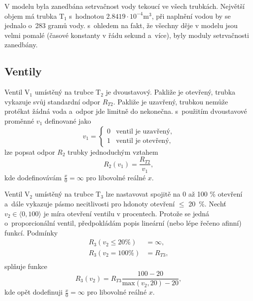 \documentclass[conference]{IEEEtran}
\begin{document}
V modelu byla zanedbána setrvačnost vody tekoucí ve všech trubkách. Největší objem má trubka $\text{T}_1$ s~hodnotou $2.8419 \cdot 10^{-4} \si{\metre\cubed}$,
při naplnění vodou by se jednalo o~283 gramů vody. s~ohledem na fakt, že všechny děje v modelu jsou velmi pomalé (časové konstanty v řádu sekund a~více),
byly moduly setrvačnosti zanedbány.


\subsection{Ventily}
\label{sec:ventily}

Ventil $\text{V}_1$ umístěný na trubce $\text{T}_2$ je dvoustavový. Pakliže je otevřený, trubka vykazuje svůj standardní odpor $R_{T2}$.
Pakliže je uzavřený, trubkou nemůže protékat žádná voda a~odpor jde limitně do nekonečna. s~použitím dvoustavové proměnné $v_1$ definované jako
\begin{equation}
    v_1 = \begin{cases} 
        0 & \text{ventil je uzavřený}, \\
        1 & \text{ventil je otevřený},
     \end{cases}
\end{equation}
lze popsat odpor $R_2$ trubky jednoduchým vztahem
\begin{equation}
    R_2(v_1) = \frac{R_{T2}}{v_1},
    \label{eq:r2}
\end{equation}
kde dodefinovávám $\frac{x}{0} = \infty$ pro libovolné reálné $x$.

Ventil $\text{V}_2$ umístěný na trubce $\text{T}_3$ lze nastavovat spojitě na 0 až 100 \% otevření a~dále vykazuje pásmo necitlivosti
pro hdonoty otevření $\le$ 20~\%.
Nechť $v_2 \in \langle 0, 100 \rangle $ je míra otevření ventilu v procentech. Protože se jedná o~proporcionální ventil,
předpokládám popis lineární (nebo lépe řečeno afinní) funkcí. Podmínky
\begin{equation}
    \begin{split}
        R_3(v_2\le20\%) &= \infty, \\
        R_3(v_2=100\%) &= R_{T3},\\        
    \end{split}
\end{equation}
splňuje funkce
\begin{equation}
    R_3(v_2) = R_{T3} \frac{100-20}{\text{max}(v_2, 20) - 20},
    \label{eq:r3}
\end{equation}
kde opět dodefinuji $\frac{x}{0} = \infty$ pro libovolné reálné $x$.
\end{document}
